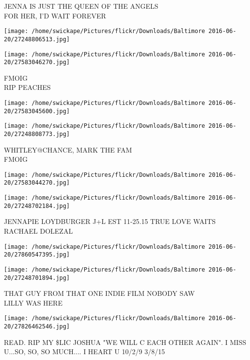 \documentclass[10pt,letterpaper]{article}
\begin{document}
JENNA IS JUST THE QUEEN OF THE ANGELS\\
FOR HER, I'D WAIT FOREVER
\pagebreak

\texttt{[image: /home/swickape/Pictures/flickr/Downloads/Baltimore 2016-06-20/27248806513.jpg]}

\vspace{0.25in}
\texttt{[image: /home/swickape/Pictures/flickr/Downloads/Baltimore 2016-06-20/27583046270.jpg]}

FMOIG\\
RIP PEACHES
\pagebreak

\texttt{[image: /home/swickape/Pictures/flickr/Downloads/Baltimore 2016-06-20/27583045600.jpg]}

\vspace{0.25in}
\texttt{[image: /home/swickape/Pictures/flickr/Downloads/Baltimore 2016-06-20/27248808773.jpg]}

WHITLEY@CHANCE, MARK THE FAM\\
FMOIG
\pagebreak

\texttt{[image: /home/swickape/Pictures/flickr/Downloads/Baltimore 2016-06-20/27583044270.jpg]}

\vspace{0.25in}
\texttt{[image: /home/swickape/Pictures/flickr/Downloads/Baltimore 2016-06-20/27248702184.jpg]}

JENNAPIE LOYDBURGER J+L EST 11{-}25.15 TRUE LOVE WAITS\\
RACHAEL DOLEZAL
\pagebreak

\texttt{[image: /home/swickape/Pictures/flickr/Downloads/Baltimore 2016-06-20/27860547395.jpg]}

\vspace{0.25in}
\texttt{[image: /home/swickape/Pictures/flickr/Downloads/Baltimore 2016-06-20/27248701894.jpg]}

THAT GUY FROM THAT ONE INDIE FILM NOBODY SAW\\
LILLY WAS HERE
\pagebreak

\texttt{[image: /home/swickape/Pictures/flickr/Downloads/Baltimore 2016-06-20/27826462546.jpg]}

READ.  RIP MY \$LIC JOSHUA "WE WILL C EACH OTHER AGAIN".  I MISS U...SO, SO, SO MUCH.... I HEART U 10/2/9 3/8/15
\pagebreak
\end{document}
